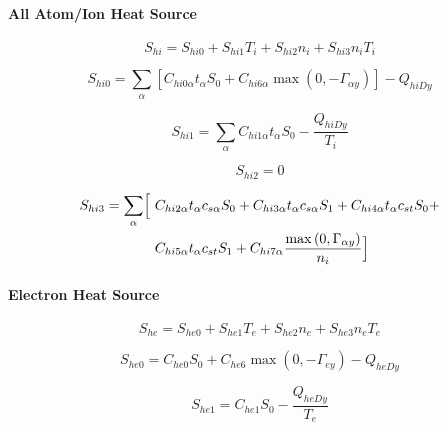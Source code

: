 \documentclass[a4paper,10pt]{report}
\begin{document}
\paragraph{All Atom/Ion Heat Source}

\begin{equation}
S_{hi}=S_{hi0}+S_{hi1}T_{i}+S_{hi2}n_{i}+S_{hi3}n_{i}T_{i}   \label{52}
\end{equation}

\begin{equation}
S_{hi0}=\sum_{\alpha}\left[ C_{hi0\alpha}t_{\alpha}S_{0}+C_{hi6\alpha}
\max\left( 0,-\Gamma_{\alpha y}\right) \right] -Q_{hiDy}   \label{53}
\end{equation}

\begin{equation}
S_{hi1}=\sum_{\alpha}C_{hi1\alpha}t_{\alpha}S_{0}-\frac{Q_{hiDy}}{T_{i}}   \label{54}
\end{equation}

\begin{equation}
S_{hi2}=0   \label{55}
\end{equation}

\begin{equation}\begin{split}
S_{hi3}=\sum_{\alpha}\Bigl[ ~ & C_{hi2\alpha}t_{\alpha}c_{s\alpha}S_{0}+C_{hi3\alpha}
t_{\alpha}c_{s\alpha}S_{1}+C_{hi4\alpha}t_{\alpha}c_{st}S_{0}+ \\
~ & C_{hi5\alpha}t_{\alpha}c_{st}S_{1}+C_{hi7\alpha}
\frac{\max\left(0,\Gamma_{\alpha y}\right) }{n_{i}}\Bigr]   \label{56}
\end{split}\end{equation}

\paragraph{Electron Heat Source}

\begin{equation}
S_{he}=S_{he0}+S_{he1}T_{e}+S_{he2}n_{e}+S_{he3}n_{e}T_{e}   \label{57}
\end{equation}

\begin{equation}
S_{he0}=C_{he0}S_{0}+C_{he6}\max\left( 0,-\Gamma_{ey}\right) -Q_{heDy}
\label{58}
\end{equation}

\begin{equation}
S_{he1}=C_{he1}S_{0}-\frac{Q_{heDy}}{T_{e}}   \label{59}
\end{equation}
\end{document}
